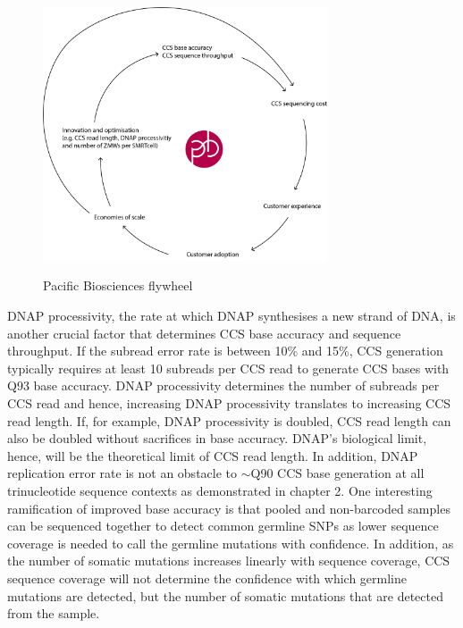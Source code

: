 \begin{figure}[h]
\caption{Pacific Biosciences flywheel}
\label{figure:flywheel}
\centering
\includegraphics[width=0.75\textwidth]{chapter4_fig2.jpg} \\ \smallskip
{}
\end{figure}


DNAP processivity, the rate at which DNAP synthesises a new strand of DNA, is another crucial factor that determines CCS base accuracy and sequence throughput. If the subread error rate is between 10\% and 15\%, CCS generation typically requires at least 10 subreads per CCS read to generate CCS bases with Q93 base accuracy. DNAP processivity determines the number of subreads per CCS read and hence, increasing DNAP processivity translates to increasing CCS read length. If, for example, DNAP processivity is doubled, CCS read length can also be doubled without sacrifices in base accuracy. DNAP’s biological limit, hence, will be the theoretical limit of CCS read length. In addition, DNAP replication error rate is not an obstacle to $\sim$Q90 CCS base generation at all trinucleotide sequence contexts as demonstrated in chapter 2. One interesting ramification of improved base accuracy is that pooled and non-barcoded samples can be sequenced together to detect common germline SNPs as lower sequence coverage is needed to call the germline mutations with confidence. In addition, as the number of somatic mutations increases linearly with sequence coverage, CCS sequence coverage will not determine the confidence with which germline mutations are detected, but the number of somatic mutations that are detected from the sample. 


